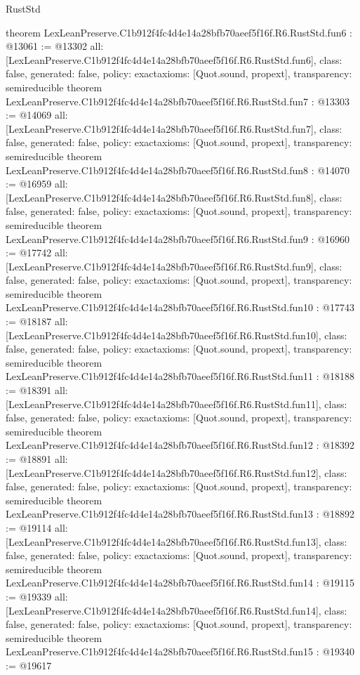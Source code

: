 \begin{lexlean}{RustStd}
\begin{coremodule}
{}
theorem LexLeanPreserve.C1b912f4fc4d4e14a28bfb70aeef5f16f.R6.RustStd.fun6 : @13061 := @13302 {
  all: [LexLeanPreserve.C1b912f4fc4d4e14a28bfb70aeef5f16f.R6.RustStd.fun6],
  class: false,
  generated: false,
  policy: exact{axioms: [Quot.sound, propext]},
  transparency: semireducible
}
theorem LexLeanPreserve.C1b912f4fc4d4e14a28bfb70aeef5f16f.R6.RustStd.fun7 : @13303 := @14069 {
  all: [LexLeanPreserve.C1b912f4fc4d4e14a28bfb70aeef5f16f.R6.RustStd.fun7],
  class: false,
  generated: false,
  policy: exact{axioms: [Quot.sound, propext]},
  transparency: semireducible
}
theorem LexLeanPreserve.C1b912f4fc4d4e14a28bfb70aeef5f16f.R6.RustStd.fun8 : @14070 := @16959 {
  all: [LexLeanPreserve.C1b912f4fc4d4e14a28bfb70aeef5f16f.R6.RustStd.fun8],
  class: false,
  generated: false,
  policy: exact{axioms: [Quot.sound, propext]},
  transparency: semireducible
}
theorem LexLeanPreserve.C1b912f4fc4d4e14a28bfb70aeef5f16f.R6.RustStd.fun9 : @16960 := @17742 {
  all: [LexLeanPreserve.C1b912f4fc4d4e14a28bfb70aeef5f16f.R6.RustStd.fun9],
  class: false,
  generated: false,
  policy: exact{axioms: [Quot.sound, propext]},
  transparency: semireducible
}
theorem LexLeanPreserve.C1b912f4fc4d4e14a28bfb70aeef5f16f.R6.RustStd.fun10 : @17743 := @18187 {
  all: [LexLeanPreserve.C1b912f4fc4d4e14a28bfb70aeef5f16f.R6.RustStd.fun10],
  class: false,
  generated: false,
  policy: exact{axioms: [Quot.sound, propext]},
  transparency: semireducible
}
theorem LexLeanPreserve.C1b912f4fc4d4e14a28bfb70aeef5f16f.R6.RustStd.fun11 : @18188 := @18391 {
  all: [LexLeanPreserve.C1b912f4fc4d4e14a28bfb70aeef5f16f.R6.RustStd.fun11],
  class: false,
  generated: false,
  policy: exact{axioms: [Quot.sound, propext]},
  transparency: semireducible
}
theorem LexLeanPreserve.C1b912f4fc4d4e14a28bfb70aeef5f16f.R6.RustStd.fun12 : @18392 := @18891 {
  all: [LexLeanPreserve.C1b912f4fc4d4e14a28bfb70aeef5f16f.R6.RustStd.fun12],
  class: false,
  generated: false,
  policy: exact{axioms: [Quot.sound, propext]},
  transparency: semireducible
}
theorem LexLeanPreserve.C1b912f4fc4d4e14a28bfb70aeef5f16f.R6.RustStd.fun13 : @18892 := @19114 {
  all: [LexLeanPreserve.C1b912f4fc4d4e14a28bfb70aeef5f16f.R6.RustStd.fun13],
  class: false,
  generated: false,
  policy: exact{axioms: [Quot.sound, propext]},
  transparency: semireducible
}
theorem LexLeanPreserve.C1b912f4fc4d4e14a28bfb70aeef5f16f.R6.RustStd.fun14 : @19115 := @19339 {
  all: [LexLeanPreserve.C1b912f4fc4d4e14a28bfb70aeef5f16f.R6.RustStd.fun14],
  class: false,
  generated: false,
  policy: exact{axioms: [Quot.sound, propext]},
  transparency: semireducible
}
theorem LexLeanPreserve.C1b912f4fc4d4e14a28bfb70aeef5f16f.R6.RustStd.fun15 : @19340 := @19617 {
}
\end{coremodule}
\end{lexlean}
